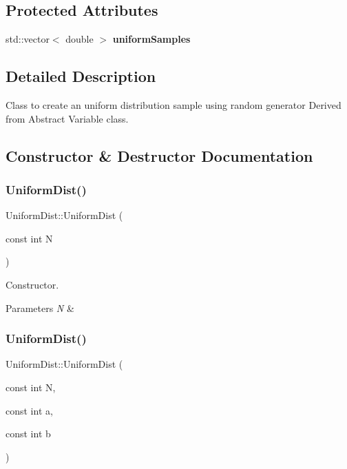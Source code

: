 \subsection*{Protected Attributes}
\begin{DoxyCompactItemize}
\item 
\mbox{\label{classUniformDist_addefdf54211e913830006e833a192748}} 
std\+::vector$<$ double $>$ {\bfseries uniform\+Samples}
\end{DoxyCompactItemize}


\subsection{Detailed Description}
Class to create an uniform distribution sample using random generator Derived from Abstract Variable class. 

\subsection{Constructor \& Destructor Documentation}
\mbox{\label{classUniformDist_a723002562ed94ff786c30048268609cb}} 
\subsubsection{\texorpdfstring{Uniform\+Dist()}{UniformDist()}\hspace{0.1cm}{\footnotesize\ttfamily [1/2]}}
{\footnotesize\ttfamily Uniform\+Dist\+::\+Uniform\+Dist (\begin{DoxyParamCaption}\item[{const int}]{N }\end{DoxyParamCaption})}



Constructor. 


\begin{DoxyParams}{Parameters}
{\em N} & \\
\hline
\end{DoxyParams}
\mbox{\label{classUniformDist_ade2ddd82d83472112ce24c575880134d}} 
\subsubsection{\texorpdfstring{Uniform\+Dist()}{UniformDist()}\hspace{0.1cm}{\footnotesize\ttfamily [2/2]}}
{\footnotesize\ttfamily Uniform\+Dist\+::\+Uniform\+Dist (\begin{DoxyParamCaption}\item[{const int}]{N,  }\item[{const int}]{a,  }\item[{const int}]{b }\end{DoxyParamCaption})}



